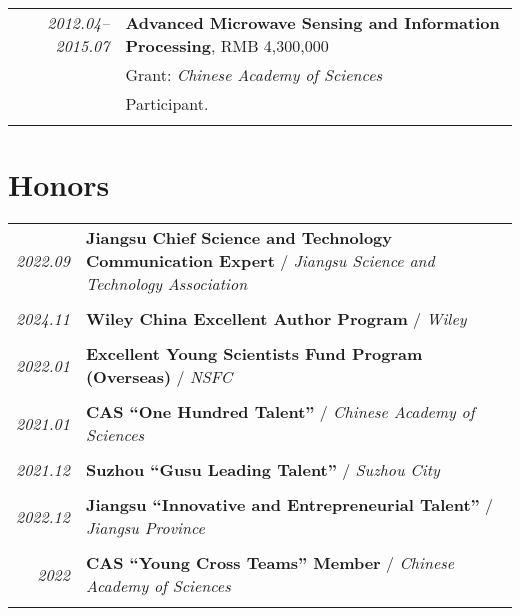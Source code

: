 \documentclass[paper=a4,fontsize=11pt]{scrartcl}
\begin{document}
\begin{longtable}{r|p{12cm}}
	\emph{2012.04--2015.07} & \textbf{Advanced Microwave Sensing and Information Processing}, RMB 4,300,000 \\
	& Grant: \emph{Chinese Academy of Sciences}\\
	& Participant.\\
	\multicolumn{2}{c}{}
	
\end{longtable}

\section*{Honors}

\begin{tabular}{r|p{11cm}}
	
	\emph{2022.09} & \textbf{Jiangsu Chief Science and Technology Communication Expert} / \emph{Jiangsu Science and Technology Association}\\
	\multicolumn{2}{c}{} \\
	
	\emph{2024.11} & \textbf{Wiley China Excellent Author Program} / \emph{Wiley}\\
	\multicolumn{2}{c}{} \\

	\emph{2022.01} & \textbf{Excellent Young Scientists Fund Program (Overseas)} / \emph{NSFC}\\
	\multicolumn{2}{c}{} \\
	
	\emph{2021.01} & \textbf{CAS ``One Hundred Talent''} / \emph{Chinese Academy of Sciences}\\
	\multicolumn{2}{c}{} \\
	
	
	\emph{2021.12} & \textbf{Suzhou ``Gusu Leading Talent''} / \emph{Suzhou City}\\
	\multicolumn{2}{c}{} \\

	\emph{2022.12} & \textbf{Jiangsu ``Innovative and Entrepreneurial Talent''} / \emph{Jiangsu Province}\\
	\multicolumn{2}{c}{} \\
	
	\emph{2022} & \textbf{CAS ``Young Cross Teams'' Member} / \emph{Chinese Academy of Sciences}\\
	\multicolumn{2}{c}{}
	
	
\end{tabular}
\end{document}
